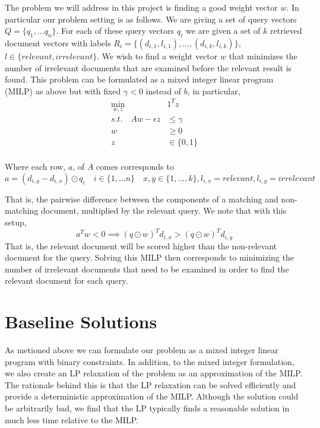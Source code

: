 \documentclass[a4paper]{article}
\begin{document}
The problem we will address in this project is finding a good weight vector $w$. In particular our
problem setting is as follows. We are giving a set of query vectors $Q = \{q_1, ... q_n\}$. For each 
of these query vectors $q_i$ we are given a set of $k$ retrieved document vectors with labels $R_i = \{(d_{i,1}, l_{i,1}), ..., (d_{i, k}, l_{i,k})\}$, 
$l \in \{relevant, irrelevant\}$.
We wish to find a weight vector $w$ that minimizes the number of irrelevant documents that are examined 
before the relevant result is found. This problem can be formulated as a mixed integer linear program (MILP)
as above but with fixed $\gamma < 0$ instead of $b$, in particular,
\begin{align*}
\min_{w,z}\quad &1^Tz\\
s.t. \quad Aw - \epsilon z &\leq \gamma\\
		w &\geq 0\\
		z &\in \{0,1\}\\
\end{align*}

Where each row, $a$, of $A$ comes corresponds to 
$$
a = (d_{i,y} - d_{i,x}) \odot q_i  \quad i \in \{1,...n\} \quad x,y \in \{1,...,k\}, l_{i,x} = relevant, l_{i,y} = irrelevant
$$

That is, the pairwise difference between the components of a matching and non-matching document, multiplied by the 
relevant query. We note that with this setup, 
$$
a^Tw < 0 \implies (q\odot w)^Td_{i,x} > (q\odot w)^Td_{i,y}
$$
That is, the relevant document will be scored higher than the non-relevant document for the query. Solving this 
MILP then corresponds to minimizing the number of irrelevant documents that need to be 
examined in order to find the relevant document for each query. 


\section{Baseline Solutions}

As metioned above we can formulate our problem as a mixed integer linear program 
with binary constraints. In addition, to the mixed integer formulation, we also create an LP
relaxation of the problem as an approximation of the MILP.
The rationale behind this is that the LP relaxation can be solved efficiently and provide a 
deterministic approximation of the MILP. Although the solution could be arbitrarily bad,
we find that the LP typically finds a reasonable solution in much less time 
relative to the MILP. 
\end{document}
